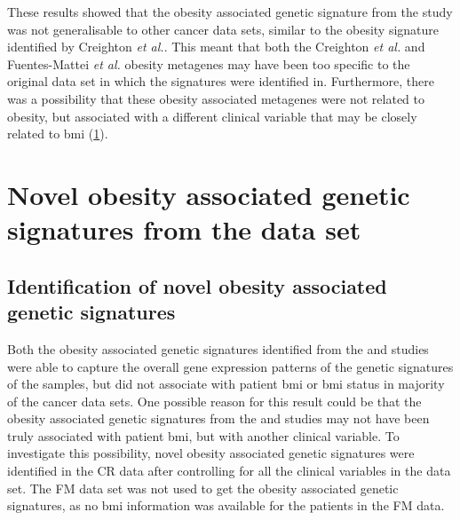 These results showed that the obesity associated genetic signature from the \citet{Fuentes-Mattei2014} study was not generalisable to other cancer data sets, similar to the obesity signature identified by Creighton \textit{et al.}.
This meant that both the Creighton \textit{et al.} and Fuentes-Mattei \textit{et al.} obesity metagenes may have been too specific to the original data set in which the signatures were identified in.
Furthermore, there was a possibility that these obesity associated metagenes were not related to obesity, but associated with a different clinical variable that may be closely related to \gls{bmi} (\cref{sec:creighton_obesity_metagene_new}).

\section{Novel obesity associated genetic signatures from the \citet{Creighton2012} data set}
\label{sec:creighton_obesity_metagene_new}

\subsection{Identification of novel obesity associated genetic signatures}
\label{sub:identification_of_obesity_associated_genetic_signatures}

Both the obesity associated genetic signatures identified from the \citet{Creighton2012} and \citet{Fuentes-Mattei2014} studies were able to capture the overall gene expression patterns  of the genetic signatures of the samples, but did not associate with patient \gls{bmi} or \gls{bmi} status in majority of the cancer data sets.
One possible reason for this result could be that the obesity associated genetic signatures from the \citet{Creighton2012} and \citet{Fuentes-Mattei2014} studies may not have been truly associated with patient \gls{bmi}, but with another clinical variable.
To investigate this possibility, novel obesity associated genetic signatures were identified in the CR data after controlling for all the clinical variables in the data set.
The FM data set was not used to get the obesity associated genetic signatures, as no \gls{bmi} information was available for the patients in the FM data.

